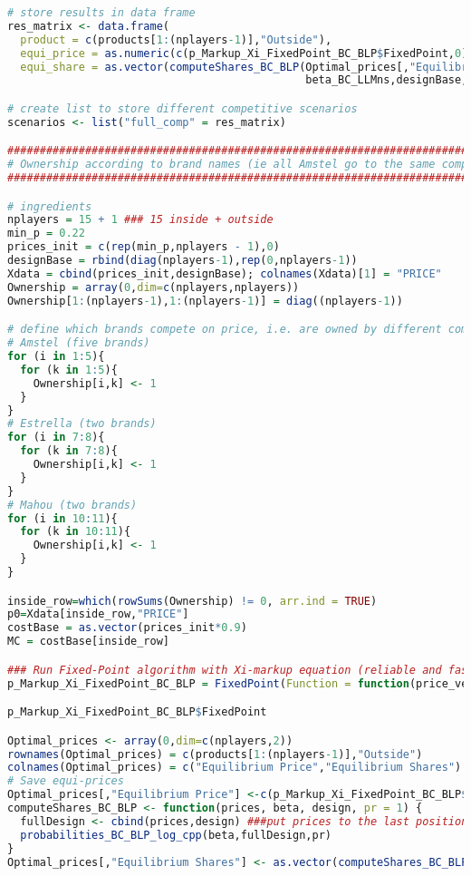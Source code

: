 \begin{lstlisting}[language=R,caption={Computing dynamic Nash equilibria in different competitive scenarios via the fixed point algorithm}, label=lst_nash_esti]
# store results in data frame
res_matrix <- data.frame(
  product = c(products[1:(nplayers-1)],"Outside"),
  equi_price = as.numeric(c(p_Markup_Xi_FixedPoint_BC_BLP$FixedPoint,0)),
  equi_share = as.vector(computeShares_BC_BLP(Optimal_prices[,"Equilibrium Price"],
                                              beta_BC_LLMns,designBase,pr=1)))

# create list to store different competitive scenarios
scenarios <- list("full_comp" = res_matrix)

###########################################################################
# Ownership according to brand names (ie all Amstel go to the same company)
###########################################################################

# ingredients
nplayers = 15 + 1 ### 15 inside + outside
min_p = 0.22
prices_init = c(rep(min_p,nplayers - 1),0)
designBase = rbind(diag(nplayers-1),rep(0,nplayers-1))
Xdata = cbind(prices_init,designBase); colnames(Xdata)[1] = "PRICE" 
Ownership = array(0,dim=c(nplayers,nplayers))
Ownership[1:(nplayers-1),1:(nplayers-1)] = diag((nplayers-1))

# define which brands compete on price, i.e. are owned by different companies
# Amstel (five brands)
for (i in 1:5){
  for (k in 1:5){
    Ownership[i,k] <- 1
  }
}
# Estrella (two brands)
for (i in 7:8){
  for (k in 7:8){
    Ownership[i,k] <- 1
  }
}
# Mahou (two brands)
for (i in 10:11){
  for (k in 10:11){
    Ownership[i,k] <- 1
  }
}

inside_row=which(rowSums(Ownership) != 0, arr.ind = TRUE)
p0=Xdata[inside_row,"PRICE"]
costBase = as.vector(prices_init*0.9)
MC = costBase[inside_row]

### Run Fixed-Point algorithm with Xi-markup equation (reliable and fast: See Table 3 in paper for comparison)
p_Markup_Xi_FixedPoint_BC_BLP = FixedPoint(Function = function(price_vec) FixedPoint_BLP_Xi(price_vec,MC=MC, ownership=Ownership,Xdata=Xdata,beta_draws=beta_BC_LLMns,pr=1),  Inputs = p0, MaxIter = 10000, ConvergenceMetricThreshold = 1e-10, Method = "Anderson")

p_Markup_Xi_FixedPoint_BC_BLP$FixedPoint

Optimal_prices <- array(0,dim=c(nplayers,2))
rownames(Optimal_prices) = c(products[1:(nplayers-1)],"Outside")
colnames(Optimal_prices) = c("Equilibrium Price","Equilibrium Shares")
# Save equi-prices
Optimal_prices[,"Equilibrium Price"] <-c(p_Markup_Xi_FixedPoint_BC_BLP$FixedPoint,0)
computeShares_BC_BLP <- function(prices, beta, design, pr = 1) {
  fullDesign <- cbind(prices,design) ###put prices to the last position here
  probabilities_BC_BLP_log_cpp(beta,fullDesign,pr)
}
Optimal_prices[,"Equilibrium Shares"] <- as.vector(computeShares_BC_BLP(Optimal_prices[,"Equilibrium Price"], beta_BC_LLMns,designBase,pr=1))


\end{lstlisting}
